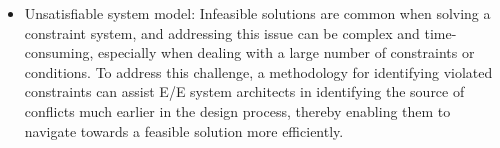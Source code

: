 \begin{itemize}
    \item Unsatisfiable system model: 
    Infeasible solutions are common when solving a constraint system, and addressing this issue can be complex and time-consuming, especially when dealing with a large number of constraints or conditions. To address this challenge, a methodology for identifying violated constraints can assist E/E system architects in identifying the source of conflicts much earlier in the design process, thereby enabling them to navigate towards a feasible solution more efficiently.
    
\end{itemize}









    

